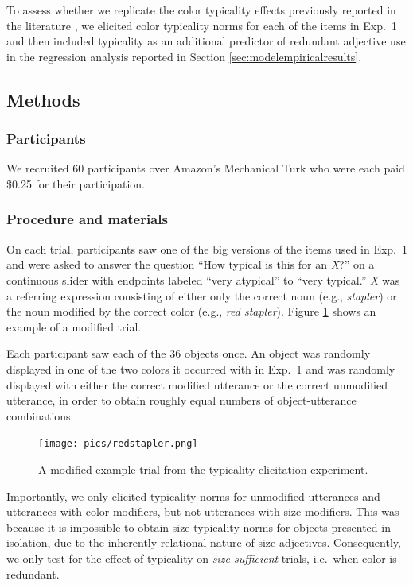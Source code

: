 \documentclass[11pt]{article}
\newcommand{\figref}[1]{Figure \ref{#1}}
\newcommand{\sectionref}[1]{Section \ref{#1}}
\begin{document}
To assess whether we replicate the color typicality effects previously reported in the literature \cite{sedivy2003a, Westerbeek2015, rubiofernandez2016}, we elicited color typicality norms for each of the items in Exp.~1 and then included typicality as an additional predictor of redundant adjective use in the regression analysis reported in \sectionref{sec:modelempiricalresults}. 

\subsection{Methods}

\subsubsection{Participants}

We recruited 60 participants over Amazon's Mechanical Turk who were each paid \$0.25 for their participation.

\subsubsection{Procedure and materials}

On each trial, participants saw one of the big versions of the items used in Exp.~1 and were asked to answer the question ``How typical is this for an \emph{X}?'' on a continuous slider with endpoints labeled ``very atypical'' to ``very typical.'' \emph{X} was a referring expression consisting of either only the correct noun (e.g., \emph{stapler}) or the noun modified by the correct color (e.g., \emph{red stapler}). \figref{fig:modifiertypstimulus} shows an example of a modified trial.

Each participant saw each of the 36 objects once. An object was randomly displayed in one of the two colors it occurred with in Exp.~1 and was randomly displayed with either the correct modified utterance or the correct unmodified utterance, in order to obtain roughly equal numbers of object-utterance combinations.

\begin{figure}
\centering
\texttt{[image: pics/redstapler.png]}
\caption{A modified example trial from the typicality elicitation experiment.}
\label{fig:modifiertypstimulus}
\end{figure}

Importantly, we only elicited typicality norms for unmodified utterances and utterances with color modifiers, but not utterances with size modifiers. This was because it is impossible to obtain size typicality norms for objects presented in isolation, due to the inherently relational nature of size adjectives. Consequently, we only test for the effect of typicality on \emph{size-sufficient} trials, i.e.~when color is redundant. 
\end{document}
